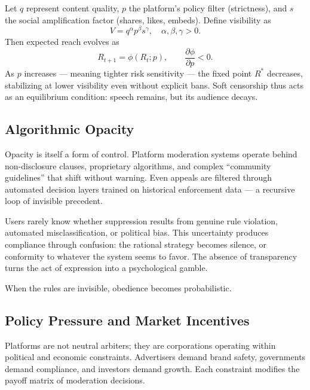 \documentclass[12pt,twoside]{book}
\begin{document}
\begin{tcolorbox}[colback=gray!5,colframe=gray!60,boxrule=0.4pt,arc=1mm,
title={Mathematical Interlude: The Reach Function}]
Let \(q\) represent content quality, \(p\) the platform’s policy filter (strictness), and \(s\) the social amplification factor (shares, likes, embeds).  
Define visibility as
\[
V = q^{\alpha} p^{\beta} s^{\gamma}, \quad \alpha,\beta,\gamma > 0.
\]
Then expected reach evolves as
\[
R_{t+1} = \phi(R_t; p), \qquad \frac{\partial \phi}{\partial p} < 0.
\]
As \(p\) increases --- meaning tighter risk sensitivity --- the fixed point \(R^*\) decreases, stabilizing at lower visibility even without explicit bans.  
Soft censorship thus acts as an equilibrium condition: speech remains, but its audience decays.
\end{tcolorbox}

\subsection*{Algorithmic Opacity}

Opacity is itself a form of control.  
Platform moderation systems operate behind non-disclosure clauses, proprietary algorithms, and complex “community guidelines” that shift without warning.  
Even appeals are filtered through automated decision layers trained on historical enforcement data --- a recursive loop of invisible precedent.

Users rarely know whether suppression results from genuine rule violation, automated misclassification, or political bias.  
This uncertainty produces compliance through confusion:  
the rational strategy becomes silence, or conformity to whatever the system seems to favor.  
The absence of transparency turns the act of expression into a psychological gamble.

\begin{keyidea}
When the rules are invisible, obedience becomes probabilistic.
\end{keyidea}

\subsection*{Policy Pressure and Market Incentives}

Platforms are not neutral arbiters; they are corporations operating within political and economic constraints.  
Advertisers demand brand safety, governments demand compliance, and investors demand growth.  
Each constraint modifies the payoff matrix of moderation decisions.
\end{document}
